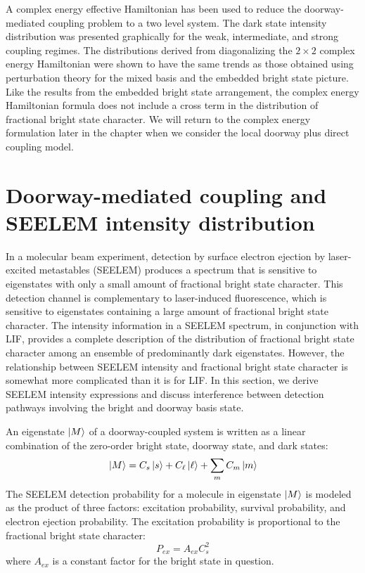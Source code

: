 A complex energy effective Hamiltonian has been used to reduce the
doorway-mediated coupling problem to a two level system. The dark
state intensity distribution was presented graphically for the weak,
intermediate, and strong coupling regimes. The distributions derived
from diagonalizing the $2 \times 2$ complex energy Hamiltonian were
shown to have the same trends as those obtained using perturbation
theory for the mixed basis and the embedded bright state picture.
Like the results from the embedded bright state arrangement, the
complex energy Hamiltonian formula does not include a cross term in
the distribution of fractional bright state character.  We will return
to the complex energy formulation later in the chapter when we
consider the local doorway plus direct coupling model.


\section{Doorway-mediated coupling and SEELEM intensity distribution}
\label{sec:seelem-intensity}

In a molecular beam experiment, detection by surface electron ejection
by laser-excited metastables (SEELEM) produces a spectrum that is
sensitive to eigenstates with only a small amount of fractional bright
state character.  This detection channel is complementary to
laser-induced fluorescence, which is sensitive to eigenstates
containing a large amount of fractional bright state character.  The
intensity information in a SEELEM spectrum, in conjunction with LIF,
provides a complete description of the distribution of fractional
bright state character among an ensemble of predominantly dark
eigenstates. However, the relationship between SEELEM intensity and
fractional bright state character is somewhat more complicated than it
is for LIF.  In this section, we derive SEELEM intensity expressions
and discuss interference between detection pathways involving the
bright and doorway basis state.

An eigenstate $\mathinner{|{M}\rangle}$ of a doorway-coupled system is written as a
linear combination of the zero-order bright state, doorway state, and
dark states:
\begin{equation}
  \mathinner{|{M}\rangle} = C_s \mathinner{|{s}\rangle} + C_{\ell} \mathinner{|{\ell}\rangle} + \sum_m C_m \mathinner{|{m}\rangle}
\end{equation}
The SEELEM detection probability for a molecule in eigenstate
$\mathinner{|{M}\rangle}$ is modeled as the product of three factors: excitation
probability, survival probability, and electron ejection
probability. The excitation probability is proportional to the
fractional bright state character:
\begin{equation}
  P_{ex} = A_{ex} C_s^2
\end{equation}
where $A_{ex}$ is a constant factor for the bright state in question.

